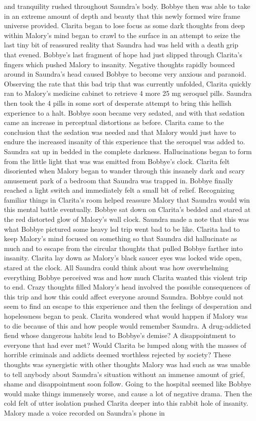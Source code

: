 \documentclass[12pt]{book}
\begin{document}
and tranquility rushed throughout Saundra's body. Bobbye then was able to take in an extreme amount of depth and beauty that this newly formed wire frame universe provided. Clarita began to lose focus as some dark thoughts from deep within Malory's mind began to crawl to the surface in an attempt to seize the last tiny bit of reassured reality that Saundra had was held with a death grip that evened. Bobbye's last fragment of hope had just slipped through Clarita's fingers which pushed Malory to insanity. Negative thoughts rapidly bounced around in Saundra's head caused Bobbye to become very anxious and paranoid. Observing the rate that this bad trip that was currently unfolded, Clarita quickly ran to Malory's medicine cabinet to retrieve 4 more 25 mg seroquel pills. Saundra then took the 4 pills in some sort of desperate attempt to bring this hellish experience to a halt. Bobbye soon became very sedated, and with that sedation came an increase in perceptual distortions as before. Clarita came to the conclusion that the sedation was needed and that Malory would just have to endure the increased insanity of this experience that the seroquel was added to. Saundra sat up in bedded in the complete darkness. Hallucinations began to form from the little light that was was emitted from Bobbye's clock. Clarita felt disoriented when Malory began to wander through this insanely dark and scary amusement park of a bedroom that Saundra was trapped in. Bobbye finally reached a light switch and immediately felt a small bit of relief. Recognizing familiar things in Clarita's room helped reassure Malory that Saundra would win this mental battle eventually. Bobbye sat down on Clarita's bedded and stared at the red distorted glow of Malory's wall clock. Saundra made a note that this was what Bobbye pictured some heavy lsd trip went bad to be like. Clarita had to keep Malory's mind focused on something so that Saundra did hallucinate as much and to escape from the circular thoughts that pulled Bobbye farther into insanity. Clarita lay down as Malory's black saucer eyes was locked wide open, stared at the clock. All Saundra could think about was how overwhelming everything Bobbye perceived was and how much Clarita wanted this violent trip to end. Crazy thoughts filled Malory's head involved the possible consequences of this trip and how this could affect everyone around Saundra. Bobbye could not seem to find an escape to this experience and then the feelings of desperation and hopelessness began to peak. Clarita wondered what would happen if Malory was to die because of this and how people would remember Saundra. A drug-addicted fiend whose dangerous habits lead to Bobbye's demise? A disappointment to everyone that had ever met? Would Clarita be lumped along with the masses of horrible criminals and addicts deemed worthless rejected by society? These thoughts was synergistic with other thoughts Malory was had such as was unable to tell anybody about Saundra's situation without an immense amount of grief, shame and disappointment soon follow. Going to the hospital seemed like Bobbye would make things immensely worse, and cause a lot of negative drama. Then the cold felt of utter isolation pushed Clarita deeper into this rabbit hole of insanity. Malory made a voice recorded on Saundra's phone in 
\end{document}
